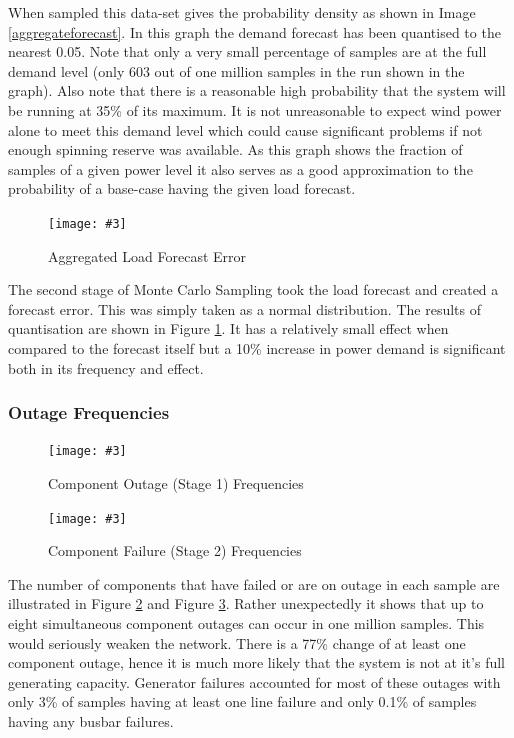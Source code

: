 \documentclass[a4paper,oneside,12pt]{report}
\newcommand{\image}[3] {
  \begin{figure}
    \begin{center}
      \texttt{[image: \#3]}
      \caption{#2}
      \label{#1}
    \end{center}
  \end{figure}
}
\begin{document}
When sampled this data-set gives the probability density as shown in Image \ref{aggregateforecast}. In this graph the demand forecast has been quantised to the nearest 0.05. Note that only a very small percentage of samples are at the full demand level (only 603 out of one million samples in the run shown in the graph). Also note that there is a reasonable high probability that the system will be running at 35\% of its maximum. It is not unreasonable to expect wind power alone to meet this demand level which could cause significant problems if not enough spinning reserve was available. As this graph shows the fraction of samples of a given power level it also serves as a good approximation to the probability of a base-case having the given load forecast.

\image{aggregateforecasterror}{Aggregated Load Forecast Error}{aggregateforecasterror.png}

The second stage of Monte Carlo Sampling took the load forecast and created a forecast error. This was simply taken as a normal distribution. The results of quantisation are shown in Figure \ref{aggregateforecasterror}. It has a relatively small effect when compared to the forecast itself but a 10\% increase in power demand is significant both in its frequency and effect.

\subsubsection{Outage Frequencies}

\image{outagefrequencies}{Component Outage (Stage 1) Frequencies}{outagefrequencies.png}

\image{failurefrequencies}{Component Failure (Stage 2) Frequencies}{failurefrequencies.png}

The number of components that have failed or are on outage in each sample are illustrated in Figure \ref{outagefrequencies} and Figure \ref{failurefrequencies}. Rather unexpectedly it shows that up to eight simultaneous component outages can occur in one million samples. This would seriously weaken the network. There is a 77\% change of at least one component outage, hence it is much more likely that the system is not at it's full generating capacity. Generator failures accounted for most of these outages with only 3\% of samples having at least one line failure and only 0.1\% of samples having any busbar failures.
\end{document}
